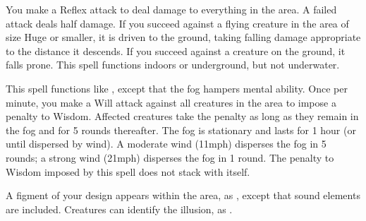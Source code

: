 \spelleffect You make a Reflex attack to deal damage to everything in the area. A failed attack deals half damage. If you succeed against a flying creature in the area of size Huge or smaller, it is driven to the ground, taking falling damage appropriate to the distance it descends. If you succeed against a creature on the ground, it falls prone.
\spellnotes This spell functions indoors or underground, but not underwater.

\spelleffect This spell functions like , except that the fog hampers mental ability. Once per minute, you make a Will attack against all creatures in the area to impose a  penalty to Wisdom. Affected creatures take the penalty as long as they remain in the fog and for 5 rounds thereafter. The fog is stationary and lasts for 1 hour (or until dispersed by wind).
\spellnotes A moderate wind (11\add mph) disperses the fog in 5 rounds; a strong wind (21\add mph) disperses the fog in 1 round. The penalty to Wisdom imposed by this spell does not stack with itself.

\spelldur{\durshort}
\spellline
\spelleffect A figment of your design appears within the area, as , except that sound elements are included.
\spellnotes Creatures can identify the illusion, as .

